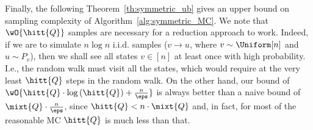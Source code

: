 Finally, the following Theorem~\ref{th:symmetric_ub} gives an upper bound on sampling complexity of Algorithm~\ref{alg:symmetric_MC}.
We note that $\wO{\hitt{Q}}$ samples are necessary for a reduction approach to work. Indeed, if we are to simulate
$n \log n$ i.i.d. samples ($v\to u$, where $v\sim \Uniform[n]$ and $u\sim P_v$), then we shall see all states
$v\in [n]$ at least once with high probability. I.e., the random walk must visit all the states, which would require at the very least 
$\hitt{Q}$ steps in the random walk. On the other hand, our bound of $\wO{\hitt{Q}\cdot\log\left(\hitt{Q}\right)+\frac{n}{\eps}}$ is always better than a naive
bound of $\mixt{Q}\cdot\frac{n}{\eps}$, since $\hitt{Q}< n\cdot\mixt{Q}$ and, in fact, for most of the reasonable MC $\hitt{Q}$ is much less than that.



